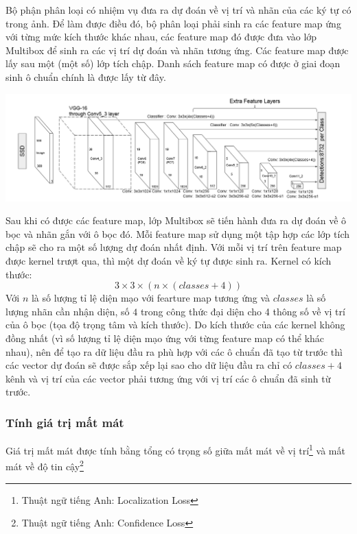 \documentclass[a4paper,12pt]{article}
\begin{document}
	Bộ phận phân loại có nhiệm vụ đưa ra dự đoán về vị trí và nhãn của các ký tự có trong ảnh. Để làm được điều đó, bộ phân loại phải sinh ra các feature map ứng với từng mức kích thước khác nhau, các feature map đó được đưa vào lớp Multibox để sinh ra các vị trí dự đoán và nhãn tương ứng. Các feature map được lấy sau một (một số) lớp tích chập. Danh sách feature map có được ở giai đoạn sinh ô chuẩn chính là được lấy từ đây. \\
	
	\begin{center}
		
		\centering
		\includegraphics[width=0.8\linewidth]{SSD_Struture.png}
		\vspace{0.5cm}
	\end{center}
	
	Sau khi có được các feature map, lớp Multibox sẽ tiến hành đưa ra dự đoán về ô bọc và nhãn gắn với ô bọc đó. Mỗi feature map sử dụng một tập hợp các lớp tích chập sẽ cho ra một số lượng dự đoán nhất định. Với mỗi vị trí trên feature map được kernel trượt qua, thì một dự đoán về ký tự được sinh ra. Kernel có kích thước:
	$$3 \times 3 \times (n \times (classes + 4))$$
	Với $n$ là số lượng tỉ lệ diện mạo với fearture map tương ứng và $classes$ là số lượng nhãn cần nhận diện, số $4$ trong công thức đại diện cho 4 thông số về vị trí của ô bọc (tọa độ trọng tâm và kích thước). Do kích thước của các kernel không đồng nhất (vì số lượng tỉ lệ diện mạo ứng với từng feature map có thể khác nhau), nên để tạo ra dữ liệu đầu ra phù hợp với các ô chuẩn đã tạo từ trước thì các vector dự đoán sẽ được sắp xếp lại sao cho dữ liệu đầu ra chỉ có $classes + 4$ kênh và vị trí của các vector phải tương ứng với vị trí các ô chuẩn đã sinh từ trước.
	
	\subsubsection{Tính giá trị mất mát}
	
	Giá trị mất mát được tính bằng tổng có trọng số giữa mất mát về vị trí\footnote{Thuật ngữ tiếng Anh: Localization Loss} và mất mát về độ tin cậy\footnote{Thuật ngữ tiếng Anh: Confidence Loss}
	
\end{document}
